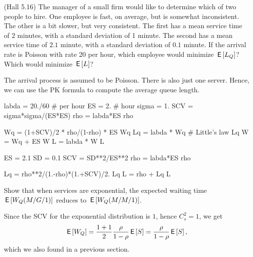 \begin{exercise}
  (Hall 5.16) The manager of a small firm would like to determine
  which of two people to hire. One employee is fast, on average, but
  is somewhat inconsistent. The other is a bit slower, but very
  consistent. The first has a mean service time of $2$ minutes, with a
  standard deviation of 1 minute. The second has a mean service time
  of $2.1$ minute, with a standard deviation of $0.1$ minute. If the arrival rate is Poisson with rate 20 per hour, which employee would minimize $\,\mathsf{E}\left[L_Q\right]$? Which would minimize $\,\mathsf{E}\left[L\right]$? 
  \begin{solution}
    The arrival process is assumed to be Poisson. There is also
    just one server. Hence, we can use the PK formula to compute the average queue length.

\begin{pyconsole}
labda = 20./60 # per hour
ES = 2. # hour
sigma = 1.
SCV = sigma*sigma/(ES*ES)
rho = labda*ES
rho

Wq = (1+SCV)/2 * rho/(1-rho) * ES
Wq
Lq = labda * Wq # Little's law
Lq
W = Wq + ES
W
L = labda * W
L
\end{pyconsole}


\begin{pyconsole}
ES = 2.1
SD = 0.1
SCV = SD**2/ES**2
rho = labda*ES
rho

Lq = rho**2/(1.-rho)*(1.+SCV)/2.
Lq
L = rho + Lq
L
\end{pyconsole}

  \end{solution}
\end{exercise}

\begin{exercise}
  Show that when services are exponential, the expected waiting time
  $\,\mathsf{E}\left[W_Q(M/G/1)\right]$ reduces to $\,\mathsf{E}\left[W_Q(M/M/1)\right]$.
    \begin{solution}
      Since the SCV for the exponential distribution is $1$, hence
      $C_s^2=1$, we get 
    \begin{equation*}
\,\mathsf{E}\left[W_Q\right] = \frac{1+1}2\frac{\rho}{1-\rho} \,\mathsf{E}\left[S\right] = \frac{\rho}{1-\rho} \,\mathsf{E}\left[S\right],
    \end{equation*}
which we also found in a previous section.
    \end{solution}
\end{exercise}


